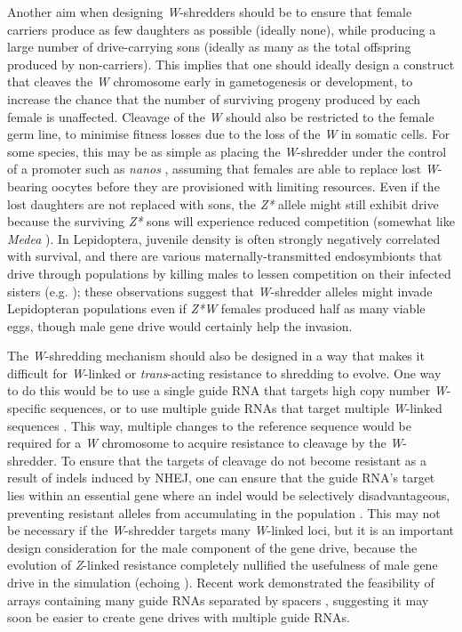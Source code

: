 \documentclass[]{rsos}%
\begin{document}
Another aim when designing \emph{W}-shredders should be to ensure that
female carriers produce as few daughters as possible (ideally none),
while producing a large number of drive-carrying sons (ideally as many
as the total offspring produced by non-carriers). This implies that one
should ideally design a construct that cleaves the \emph{W} chromosome
early in gametogenesis or development, to increase the chance that the
number of surviving progeny produced by each female is unaffected.
Cleavage of the \emph{W} should also be restricted to the female germ
line, to minimise fitness losses due to the loss of the \emph{W} in
somatic cells. For some species, this may be as simple as placing the
\emph{W}-shredder under the control of a promoter such as \emph{nanos}
\citep{champer2018re, zhang2018si}, assuming that females are able to
replace lost \emph{W}-bearing oocytes before they are provisioned with
limiting resources. Even if the lost daughters are not replaced with
sons, the \emph{Z*} allele might still exhibit drive because the
surviving \emph{Z*} sons will experience reduced competition (somewhat
like \emph{Medea} \citep{hay2010en}). In Lepidoptera, juvenile density
is often strongly negatively correlated with survival, and there are
various maternally-transmitted endosymbionts that drive through
populations by killing males to lessen competition on their infected
sisters (e.g. \citep{jiggins2000bu, jiggins2003ma}); these observations
suggest that \emph{W}-shredder alleles might invade Lepidopteran
populations even if \emph{Z*W} females produced half as many viable
eggs, though male gene drive would certainly help the invasion.

The \emph{W}-shredding mechanism should also be designed in a way that
makes it difficult for \emph{W}-linked or \emph{trans}-acting resistance
to shredding to evolve. One way to do this would be to use a single
guide RNA that targets high copy number \emph{W}-specific sequences, or
to use multiple guide RNAs that target multiple \emph{W}-linked
sequences \citep{champer2018re, oberhofer2018be}. This way, multiple
changes to the reference sequence would be required for a \emph{W}
chromosome to acquire resistance to cleavage by the \emph{W}-shredder.
To ensure that the targets of cleavage do not become resistant as a
result of indels induced by NHEJ, one can ensure that the guide RNA's
target lies within an essential gene where an indel would be selectively
disadvantageous, preventing resistant alleles from accumulating in the
population \citep{champer2018re, oberhofer2018be}. This may not be
necessary if the \emph{W}-shredder targets many \emph{W}-linked loci,
but it is an important design consideration for the male component of
the gene drive, because the evolution of \emph{Z}-linked resistance
completely nullified the usefulness of male gene drive in the simulation
(echoing \citep{unckless2017ev}). Recent work demonstrated the
feasibility of arrays containing many guide RNAs separated by spacers
\citep{kurata2018hi}, suggesting it may soon be easier to create gene
drives with multiple guide RNAs.
\end{document}
